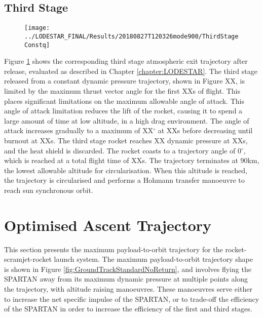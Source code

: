 \subsection{Third Stage}

\begin{figure}[ht]
\centering
\texttt{[image: ../LODESTAR\_FINAL/Results/20180827T120326mode900/ThirdStageConstq]}
\caption{}
\label{fig:ThirdStageConstq}
\end{figure}

Figure \ref{fig:ThirdStageConstq} shows the corresponding third stage atmospheric exit trajectory after release, evaluated as described in Chapter \ref{chapter:LODESTAR}. The third stage released from a constant dynamic pressure trajectory, shown in Figure XX, is limited by the maximum thrust vector angle for the first XXs of flight. This places significant limitations on the maximum allowable angle of attack. This angle of attack limitation reduces the lift of the rocket, causing it to spend a large amount of time at low altitude, in a high drag environment. The angle of attack increases gradually to a maximum of XX$^\circ$ at XXs before decreasing until burnout at XXs. The third stage rocket reaches XX dynamic pressure at XXs, and the heat shield is discarded. The rocket coasts to a trajectory angle of 0$^\circ$, which is reached at a total flight time of XXs. The trajectory terminates at 90km, the lowest allowable altitude for circularisation. 
When this altitude is reached, the trajectory is circularised and performs a Hohmann transfer manoeuvre to reach sun synchronous orbit.








\section{Optimised Ascent Trajectory}

This section presents the maximum payload-to-orbit trajectory for the rocket-scramjet-rocket launch system. 
The maximum payload-to-orbit trajectory shape is shown in Figure \ref{fig:GroundTrackStandardNoReturn}, and involves flying the SPARTAN away from its maximum dynamic pressure at multiple points along the trajectory, with altitude raising manoeuvres. These manoeuvres serve either to increase the net specific impulse of the SPARTAN, or to trade-off the efficiency of the SPARTAN in order to increase the efficiency of the first and third stages. 

